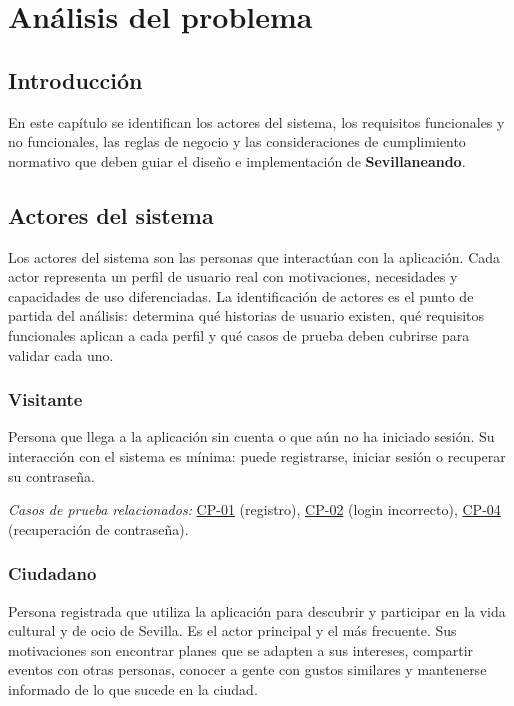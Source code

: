 \chapter{Análisis del problema}\label{cap:analisis}

\section{Introducción}

En este capítulo se identifican los actores del sistema, los requisitos funcionales y no funcionales, las reglas de negocio y las consideraciones de cumplimiento normativo que deben guiar el diseño e implementación de \textbf{Sevillaneando}.

\section{Actores del sistema}

Los actores del sistema son las personas que interactúan con la aplicación. Cada actor representa un perfil de usuario real con motivaciones, necesidades y capacidades de uso diferenciadas. La identificación de actores es el punto de partida del análisis: determina qué historias de usuario existen, qué requisitos funcionales aplican a cada perfil y qué casos de prueba deben cubrirse para validar cada uno.

\subsection{Visitante}

Persona que llega a la aplicación sin cuenta o que aún no ha iniciado sesión. Su interacción con el sistema es mínima: puede registrarse, iniciar sesión o recuperar su contraseña.

\textit{Casos de prueba relacionados:} \hyperref[cp:01]{CP-01} (registro), \hyperref[cp:02]{CP-02} (login incorrecto), \hyperref[cp:04]{CP-04} (recuperación de contraseña).

\subsection{Ciudadano}

Persona registrada que utiliza la aplicación para descubrir y participar en la vida cultural y de ocio de Sevilla. Es el actor principal y el más frecuente. Sus motivaciones son encontrar planes que se adapten a sus intereses, compartir eventos con otras personas, conocer a gente con gustos similares y mantenerse informado de lo que sucede en la ciudad.

